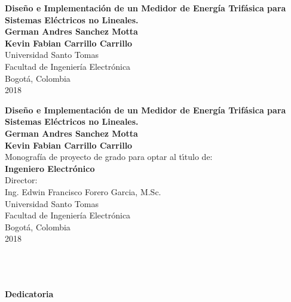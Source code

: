 \begin{center}
\thispagestyle{empty} \vspace*{0cm} \huge\textbf{
Diseño e Implementaci\'{o}n de un Medidor de Energ\'{i}a Trif\'{a}sica para Sistemas El\'{e}ctricos no Lineales. }\\[6.0cm]
\Large\textbf{German Andres Sanchez Motta\\Kevin Fabian Carrillo Carrillo}\\[6.0cm]
\small Universidad Santo Tomas\\
Facultad de Ingenier\'{i}a Electr\'{o}nica\\
Bogot\'{a}, Colombia\\
2018\\
\end{center}

\newpage{\pagestyle{empty}\cleardoublepage}

\newpage
\begin{center}
\thispagestyle{empty} \vspace*{0cm} \huge\textbf{
Diseño e Implementaci\'{o}n de un Medidor de Energ\'{i}a Trif\'{a}sica para Sistemas El\'{e}ctricos no Lineales. }\\[2.5cm]
\Large\textbf{German Andres Sanchez Motta\\Kevin Fabian Carrillo Carrillo}\\[2.5cm]
\small Monograf\'{i}a de proyecto de grado para optar al
t\'{\i}tulo de:\\
\textbf{Ingeniero Electr\'{o}nico }\\[2.5cm]

Director:\\
Ing. Edwin Francisco Forero Garcia, M.Sc.\\[3.7cm]




Universidad Santo Tomas\\
Facultad de Ingenier\'{i}a Electr\'{o}nica \\
Bogot\'{a}, Colombia\\
2018\\
\end{center}


\newpage{\cleardoublepage}
\thispagestyle{empty} \textbf{}\normalsize
\\\\\\%
\textbf{\LARGE Dedicatoria}\\[4.0cm]
\setcounter{page}{3}
\\\\

